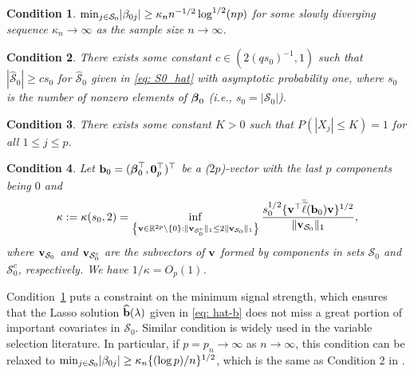 \documentclass[11pt]{article}
\newtheorem{condition}{Condition}%
\def\v{{\bf v}}
\def\bb{{\bf b}}
\def\0{{\bf 0}}
\newcommand{\bbeta}{\mbox{\boldmath $\beta$}}
\begin{document}
\begin{condition}\label{Condition2}
	${\rm min}_{j \in \mathcal{S}_{0}}|\beta_{0j}| \geq \kappa_{n}n^{-1/2}\log^{1/2} (np)$ for some
	slowly diverging sequence $\kappa_n \to \infty$ as the sample size $n \to \infty$.
\end{condition}

\begin{condition} \label{Condition3}
	There exists some constant $c \in (2(qs_{0})^{-1},1)$ such that $|\widehat{\mathcal{S}}_0| \geq cs_{0}$ for $\widehat{\mathcal{S}}_0$ given in \eqref{eq: S0_hat} with asymptotic probability one, where $s_0$ is the number of nonzero elements of $\bbeta_0$ (i.e., $s_0=|\mathcal{S}_0|$). 
\end{condition}

\begin{condition} \label{Condition4}
	There exists some constant $K>0$ such that $P(|X_j|\leq K)=1$ for all $1\leq j\leq p$. 
\end{condition}


\begin{condition} \label{Condition5}
	Let $\bb_0=(\bbeta_0^{\top}, \0_p^{\top})^{\top}$ be a ($2p$)-vector with the last $p$ components being $0$ and
	\begin{align*}
	\kappa: =\kappa(s_0, 2)=\inf_{\left\{\v \in \mathbb{R}^{2p}\backslash \{0\}: \|\v_{\mathcal{S}_{0}^{c}}\|_{1} \leq 2 \|\v_{\mathcal{S}_{0}}\|_{1} \right\} } \frac{s_{0}^{1 / 2}\{\v^{\top} 	\ddot{\widetilde{\ell}}(\bb_0)\v\}^{1 / 2}}{\|\v_{\mathcal{S}_{0}}\|_{1}},  
	\end{align*} 
	where $\v_{\mathcal{S}_{0}}$ and $\v_{\mathcal{S}_{0}^{c}}$ are the subvectors 
	of $\v$ formed by components in sets $\mathcal{S}_{0}$ and $\mathcal{S}_{0}^{c}$, respectively. We have $1/\kappa=O_{p}(1)$.
\end{condition}




Condition~\ref{Condition2} puts a constraint on the minimum signal strength, which ensures that the Lasso solution $\widehat{\bb}(\lambda)$ given in \eqref{eq: hat-b} does not miss a great portion of important covariates in $\mathcal{S}_0$. Similar condition is widely used in the variable selection literature. In particular, if $p=p_n\to \infty$ as $n\to\infty$, this condition can be relaxed to ${\rm min}_{j \in \mathcal{S}_{0}}|\beta_{0j}| \geq \kappa_{n}\{(\log p)/n\}^{1/2}$, which is the same as Condition 2 in \cite{fan2020rank}. 
\end{document}
